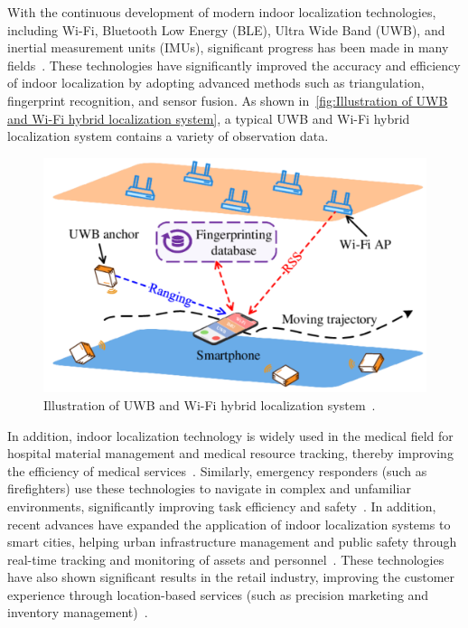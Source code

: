 \documentclass[12pt,a4paper]{article}
\numberwithin{equation}{section}
\begin{document}
With the continuous development of modern indoor localization technologies,
including Wi-Fi, Bluetooth Low Energy (BLE), Ultra Wide Band (UWB), and inertial
measurement units (IMUs), significant progress has been made in many
fields~\cite{guo2019survey}. These technologies have significantly improved the
accuracy and efficiency of indoor localization by adopting advanced methods such
as triangulation, fingerprint recognition, and sensor fusion. As shown
in~\autoref{fig:Illustration of UWB and Wi-Fi hybrid localization system}, a
typical UWB and Wi-Fi hybrid localization system contains a variety of
observation data.

\begin{figure}[H]
  \centering
  \includegraphics[width=0.8\linewidth]{images/intro.png}
  \caption{Illustration of UWB and Wi-Fi hybrid localization
    system~\cite{article}.}
  \label{fig:Illustration of UWB and Wi-Fi hybrid localization system}
\end{figure}

In addition, indoor localization technology is widely used in the medical field
for hospital material management and medical resource tracking, thereby
improving the efficiency of medical services~\cite{HOSSAIN20151}. Similarly,
emergency responders (such as firefighters) use these technologies to navigate
in complex and unfamiliar environments, significantly improving task efficiency
and safety~\cite {fischer2010location}. In addition, recent advances have
expanded the application of indoor localization systems to smart cities, helping
urban infrastructure management and public safety through real-time tracking and
monitoring of assets and personnel~\cite{zhang2020smartcity}. These technologies
have also shown significant results in the retail industry, improving the
customer experience through location-based services (such as precision marketing
and inventory management)~\cite{chen2019indoor}.
\end{document}
